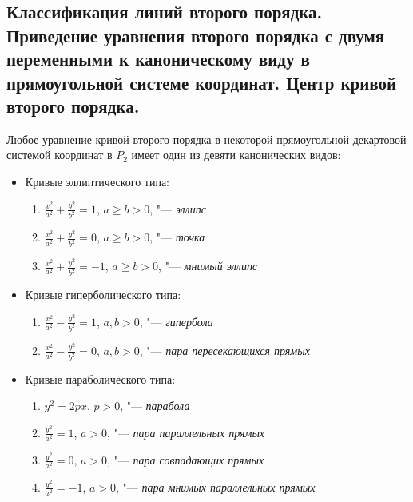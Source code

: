 \subsection{Классификация линий второго порядка. Приведение уравнения второго порядка с двумя переменными к каноническому виду в прямоугольной системе координат. Центр кривой второго порядка.}
    
    \begin{theorem}
    	Любое уравнение кривой второго порядка в некоторой прямоугольной декартовой системой координат в $P_2$ имеет один из девяти канонических видов:
    	\begin{itemize}
    		\item Кривые эллиптического типа:
    		\begin{enumerate}
    			\item $\frac{x^2}{a^2} + \frac{y^2}{b^2} = 1$, $a \ge b > 0$, "--- \textit{эллипс}
    			\item $\frac{x^2}{a^2} + \frac{y^2}{b^2} = 0$, $a \ge b > 0$, "--- \textit{точка}
    			\item $\frac{x^2}{a^2} + \frac{y^2}{b^2} = -1$, $a \ge b > 0$, "--- \textit{мнимый эллипс}
    		\end{enumerate}
    	
    		\item Кривые гиперболического типа:
    		\begin{enumerate}
    			\item $\frac{x^2}{a^2} - \frac{y^2}{b^2} = 1$, $a, b > 0$, "--- \textit{гипербола}
    			\item $\frac{x^2}{a^2} - \frac{y^2}{b^2} = 0$, $a, b > 0$, "--- \textit{пара пересекающихся прямых}
    		\end{enumerate}
    	
    		\item Кривые параболического типа:
    		\begin{enumerate}
    			\item $y^2 = 2px$, $p > 0$, "--- \textit{парабола}
    			\item $\frac{y^2}{a^2} = 1$, $a > 0$, "--- \textit{пара параллельных прямых}
    			\item $\frac{y^2}{a^2} = 0$, $a > 0$, "--- \textit{пара совпадающих прямых}
    			\item $\frac{y^2}{a^2} = -1$, $a > 0$, "--- \textit{пара мнимых параллельных прямых}
    		\end{enumerate}
    	\end{itemize}
    \end{theorem}
    

